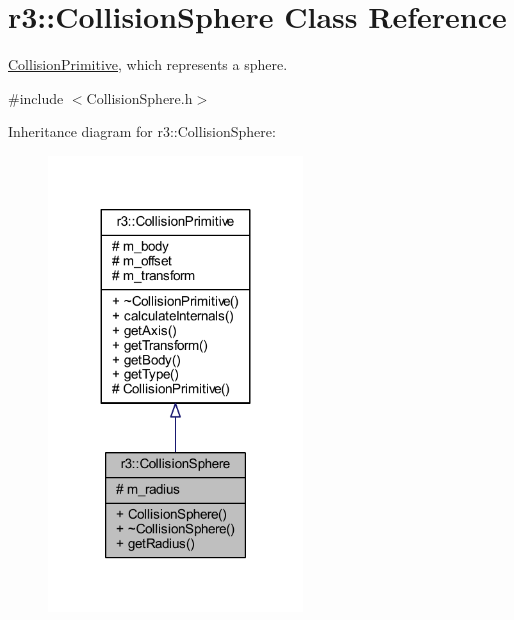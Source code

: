 \hypertarget{classr3_1_1_collision_sphere}{}\section{r3\+:\+:Collision\+Sphere Class Reference}
\label{classr3_1_1_collision_sphere}


\mbox{\hyperlink{classr3_1_1_collision_primitive}{Collision\+Primitive}}, which represents a sphere.  




{\ttfamily \#include $<$Collision\+Sphere.\+h$>$}



Inheritance diagram for r3\+:\+:Collision\+Sphere\+:\nopagebreak
\begin{figure}[H]
\begin{center}
\leavevmode
\includegraphics[width=191pt]{classr3_1_1_collision_sphere__inherit__graph}
\end{center}
\end{figure}


